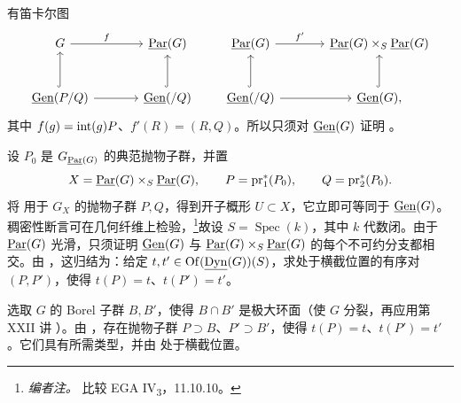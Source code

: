 有笛卡尔图
\[
\begin{tikzcd}[column sep=large,row sep=large]
 G \arrow[r,"f"] & \Par(G)\\
 \Gen(P/Q) \arrow[u,hook] \arrow[r] & \Gen(/Q)\arrow[u,hook]
\end{tikzcd}
\qquad
\begin{tikzcd}[column sep=large,row sep=large]
 \Par(G) \arrow[r,"f'"] & \Par(G)\times_S\Par(G)\\
 \Gen(/Q) \arrow[u,hook] \arrow[r] & \Gen(G)\arrow[u,hook],
\end{tikzcd}
\]
其中 \(f(g)=\operatorname{int}(g)P\)、\(f'(R)=(R,Q)\)。所以只须对 \(\underline{\operatorname{Gen}}(G)\) 证明 \textup{}。

设 \(P_0\) 是 \(G_{\underline{\operatorname{Par}}(G)}\) 的典范抛物子群，并置
\[
 X=\underline{\operatorname{Par}}(G)\times_S\underline{\operatorname{Par}}(G),\qquad
 P=\operatorname{pr}_1^*(P_0),\qquad
 Q=\operatorname{pr}_2^*(P_0).
\]
将 \textup{} 用于 \(G_X\) 的抛物子群 \(P,Q\)，得到开子概形 \(U\subset X\)，它立即可等同于 \(\underline{\operatorname{Gen}}(G)\)。稠密性断言可在几何纤维上检验，\footnote{\emph{编者注。} 比较 EGA IV\textsubscript{3}，11.10.10。}故设 \(S=\operatorname{Spec}(k)\)，其中 \(k\) 代数闭。由于 \(\underline{\operatorname{Par}}(G)\) 光滑，只须证明 \(\underline{\operatorname{Gen}}(G)\) 与 \(\underline{\operatorname{Par}}(G)\times_S\underline{\operatorname{Par}}(G)\) 的每个不可约分支都相交。由 ，这归结为：给定 \(t,t'\in\operatorname{Of}(\underline{\operatorname{Dyn}}(G))(S)\)，求处于横截位置的有序对 \((P,P')\)，使得 \(t(P)=t\)、\(t(P')=t'\)。

选取 \(G\) 的 Borel 子群 \(B,B'\)，使得 \(B\cap B'\) 是极大环面（使 \(G\) 分裂，再应用第 XXII 讲 ）。由 ，存在抛物子群 \(P\supset B\)、\(P'\supset B'\)，使得 \(t(P)=t\)、\(t(P')=t'\)。它们具有所需类型，并由 \textup{} 处于横截位置。
\SGAQED

